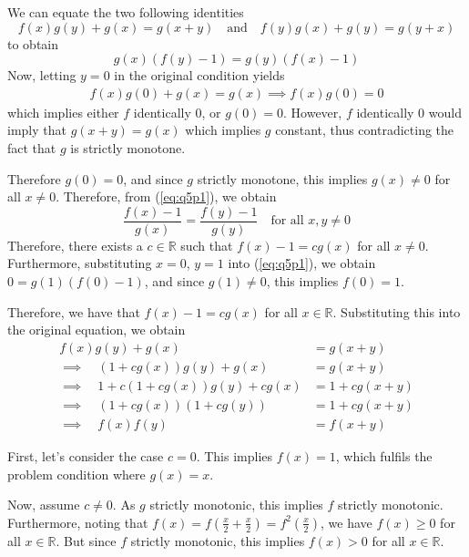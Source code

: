 \documentclass{article}
\begin{document}
\begin{enumerate}[1.]
We can equate the two following identities
$$ f(x)g(y) + g(x) = g(x+y) \quad \textrm{and} \quad f(y)g(x) + g(y) = g(y+x) $$
to obtain
\begin{equation} \label{eq:q5p1}
    g(x) (f(y) - 1) = g(y) (f(x) - 1) 
\end{equation}
Now, letting $y = 0$ in the original condition yields
\begin{align*}
    f(x) g(0) + g(x) = g(x) \implies f(x) g(0) = 0
\end{align*}
which implies either $f$ identically 0, or $g(0) = 0$.  However, $f$ identically 0 would imply that $g(x+y) = g(x)$ which implies $g$ constant, thus contradicting the fact that $g$ is strictly monotone.

Therefore $g(0) = 0$, and since $g$ strictly monotone, this implies $g(x) \not = 0$ for all $x \not = 0$.  Therefore, from (\ref{eq:q5p1}), we obtain
\begin{equation*}
    \frac{f(x) - 1}{g(x)} = \frac{f(y) - 1}{g(y)} \quad \textrm{for all } x, y \not = 0
\end{equation*}
Therefore, there exists a $c \in \mathbb{R}$ such that $f(x) - 1 = cg(x)$ for all $x \not = 0$.  Furthermore, substituting $x = 0$, $y = 1$ into (\ref{eq:q5p1}), we obtain $0 = g(1)(f(0) - 1)$, and since $g(1) \not = 0$, this implies $f(0) = 1$.

Therefore, we have that $f(x) - 1 = cg(x)$ for all $x \in \mathbb{R}$. Substituting this into the original equation, we obtain
\begin{align*}
    f(x)g(y) + g(x) &= g(x+y) \\
    \implies \quad (1 + cg(x))g(y) + g(x) &= g(x+y) \\
    \implies \quad 1 + c(1 + cg(x))g(y) + cg(x) &= 1 + cg(x+y) \\
    \implies \quad (1 + cg(x))(1 + cg(y)) &= 1 + cg(x+y) \\
    \implies \quad f(x)f(y) &= f(x+y)
\end{align*}

First, let's consider the case $c = 0$. This implies $f(x) = 1$, which fulfils the problem condition where $g(x) = x$.

Now, assume $c \not = 0$. As $g$ strictly monotonic, this implies $f$ strictly monotonic.  Furthermore, noting that $f(x) = f\left(\frac{x}{2} + \frac{x}{2} \right) = f^2\left(\frac{x}{2} \right)$, we have $f(x) \geq 0$ for all $x \in \mathbb{R}$.  But since $f$ strictly monotonic, this implies $f(x) > 0$ for all $x \in \mathbb{R}$.


\end{enumerate}
\end{document}
